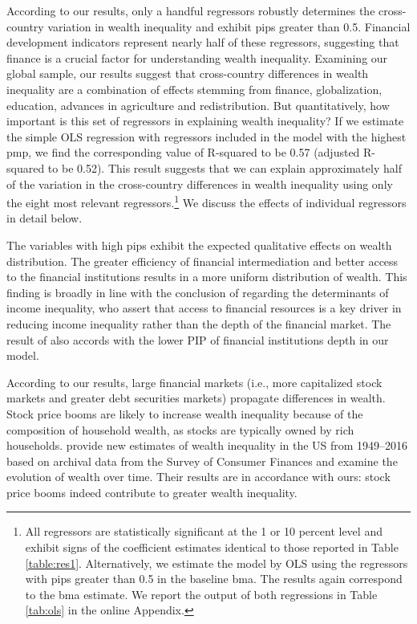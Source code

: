 \documentclass[a4paper,11pt]{article}
\begin{document}
According to our results, only a handful regressors robustly determines the cross-country variation in wealth inequality and exhibit \acp{pip} greater than 0.5. Financial development indicators represent nearly half of these regressors, suggesting that finance is a crucial factor for understanding wealth inequality. Examining our global sample, our results suggest that cross-country differences in wealth inequality are a combination of effects stemming from finance, globalization, education, advances in agriculture and redistribution. But quantitatively, how important is this set of regressors in explaining wealth inequality? If we estimate the simple OLS regression with regressors included in the model with the highest \ac{pmp}, we find the corresponding value of R-squared to be 0.57 (adjusted R-squared to be 0.52). This result suggests that we can explain approximately half of the variation in the cross-country differences in wealth inequality using only the eight most relevant regressors.\footnote{All regressors are statistically significant at the 1 or 10 percent level and exhibit signs of the coefficient estimates identical to those reported in Table \ref{table:res1}. Alternatively, we estimate the model by OLS using the regressors with \acp{pip} greater than 0.5 in the baseline \ac{bma}. The results again correspond to the \ac{bma} estimate. We report the output of both regressions in Table \ref{tab:ols} in the online Appendix.} We discuss the effects of individual regressors in detail below.

The variables with high \acp{pip} exhibit the expected qualitative effects on wealth distribution. The greater efficiency of financial intermediation and better access to the financial institutions results in a more uniform distribution of wealth. This finding is broadly in line with the conclusion of \citet{claessens2007finance} regarding the determinants of income inequality, who assert that access to financial resources is a key driver in reducing income inequality rather than the depth of the financial market. The result of \citet{claessens2007finance} also accords with the lower PIP of financial institutions depth in our model. 

According to our results, large financial markets (i.e., more capitalized stock markets and greater debt securities markets) propagate differences in wealth. Stock price booms are likely to increase wealth inequality because of the composition of household wealth, as stocks are typically owned by rich households. \citet{kuhn} provide new estimates of wealth inequality in the US from 1949--2016 based on archival data from the Survey of Consumer Finances and examine the evolution of wealth over time. Their results are in accordance with ours: stock price booms indeed contribute to greater wealth inequality.  
\end{document}
